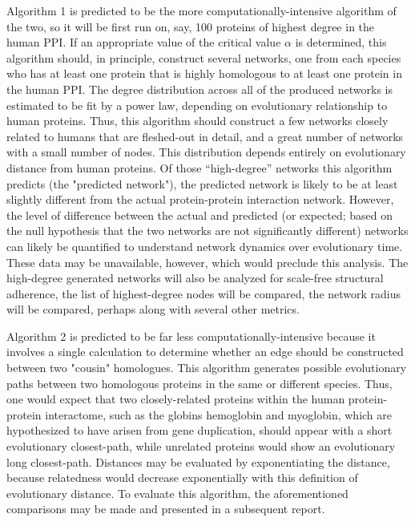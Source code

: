 \documentclass{acmsiggraph}               %
\begin{document}
Algorithm 1 is predicted to be the more computationally-intensive algorithm of the two, so it will be first run on, say, 100 proteins of highest degree in the human PPI. If an appropriate value of the critical value \(\alpha\) is determined, this algorithm should, in principle, construct several networks, one from each species who has at least one protein that is highly homologous to at least one protein in the human PPI. The degree distribution across all of the produced networks is estimated to be fit by a power law, depending on evolutionary relationship to human proteins. Thus, this algorithm should construct a few networks closely related to humans that are fleshed-out in detail, and a great number of networks with a small number of nodes. This distribution depends entirely on evolutionary distance from human proteins. Of those ``high-degree'' networks this algorithm predicts (the "predicted network"), the predicted network is likely to be at least slightly different from the actual protein-protein interaction network. However, the level of difference between the actual and predicted (or expected; based on the null hypothesis that the two networks are not significantly different) networks can likely be quantified to understand network dynamics over evolutionary time. These data may be unavailable, however, which would preclude this analysis. The high-degree generated networks will also be analyzed for scale-free structural adherence, the list of highest-degree nodes will be compared, the network radius will be compared, perhaps along with several other metrics.

Algorithm 2 is predicted to be far less computationally-intensive because it involves a single calculation to determine whether an edge should be constructed between two "cousin" homologues. This algorithm generates possible evolutionary paths between two homologous proteins in the same or different species. Thus, one would expect that two closely-related proteins within the human protein-protein interactome, such as the globins hemoglobin and myoglobin, which are hypothesized to have arisen from gene duplication, should appear with a short evolutionary closest-path, while unrelated proteins would show an evolutionary long closest-path. Distances may be evaluated by exponentiating the distance, because relatedness would decrease exponentially with this definition of evolutionary distance. To evaluate this algorithm, the aforementioned comparisons may be made and presented in a subsequent report.
\end{document}
